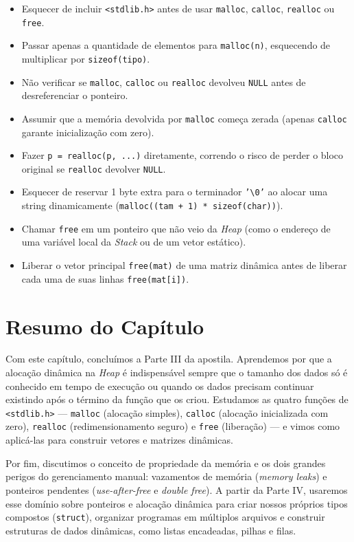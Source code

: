 \begin{itemize}
    \item Esquecer de incluir \texttt{<stdlib.h>} antes de usar \texttt{malloc}, \texttt{calloc}, \texttt{realloc} ou \texttt{free}.
    \item Passar apenas a quantidade de elementos para \texttt{malloc(n)}, esquecendo de multiplicar por \texttt{sizeof(tipo)}.
    \item Não verificar se \texttt{malloc}, \texttt{calloc} ou \texttt{realloc} devolveu \texttt{NULL} antes de desreferenciar o ponteiro.
    \item Assumir que a memória devolvida por \texttt{malloc} começa zerada (apenas \texttt{calloc} garante inicialização com zero).
    \item Fazer \texttt{p = realloc(p, ...)} diretamente, correndo o risco de perder o bloco original se \texttt{realloc} devolver \texttt{NULL}.
    \item Esquecer de reservar 1 byte extra para o terminador \texttt{'\textbackslash 0'} ao alocar uma string dinamicamente (\texttt{malloc((tam + 1) * sizeof(char))}).
    \item Chamar \texttt{free} em um ponteiro que não veio da \textit{Heap} (como o endereço de uma variável local da \textit{Stack} ou de um vetor estático).
    \item Liberar o vetor principal \texttt{free(mat)} de uma matriz dinâmica antes de liberar cada uma de suas linhas \texttt{free(mat[i])}.
\end{itemize}

\section*{Resumo do Capítulo}

Com este capítulo, concluímos a Parte III da apostila. Aprendemos por que a alocação dinâmica na \textit{Heap} é indispensável sempre que o tamanho dos dados só é conhecido em tempo de execução ou quando os dados precisam continuar existindo após o término da função que os criou. Estudamos as quatro funções de \texttt{<stdlib.h>} — \texttt{malloc} (alocação simples), \texttt{calloc} (alocação inicializada com zero), \texttt{realloc} (redimensionamento seguro) e \texttt{free} (liberação) — e vimos como aplicá-las para construir vetores e matrizes dinâmicas.

Por fim, discutimos o conceito de propriedade da memória e os dois grandes perigos do gerenciamento manual: vazamentos de memória (\textit{memory leaks}) e ponteiros pendentes (\textit{use-after-free} e \textit{double free}). A partir da Parte IV, usaremos esse domínio sobre ponteiros e alocação dinâmica para criar nossos próprios tipos compostos (\texttt{struct}), organizar programas em múltiplos arquivos e construir estruturas de dados dinâmicas, como listas encadeadas, pilhas e filas.

